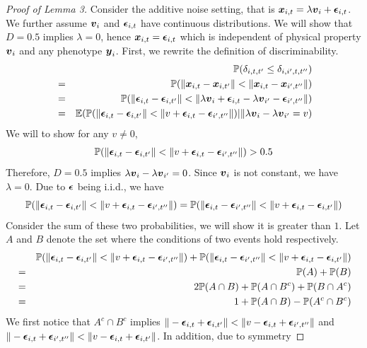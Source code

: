 \documentclass{article}
\begin{document}
\begin{proof}[Proof of Lemma 3]
	Consider the additive noise setting, that is $\boldsymbol{x}_{i,t}=\lambda \boldsymbol{v}_{i} + \boldsymbol{\epsilon}_{i,t}$. We further assume  $\boldsymbol{v}_{i}$ and $\boldsymbol{\epsilon}_{i,t}$ have continuous distributions. We will show that $D=0.5$ implies $\lambda = 0$, hence $\boldsymbol{x}_{i,t} = \boldsymbol{\epsilon}_{i,t}$ which is independent of physical property $\boldsymbol{v}_{i}$ and any phenotype $\boldsymbol{y}_{i}$. First, we rewrite the definition of discriminability.
	\begin{eqnarray*}
		& &\mathbb{P}(\delta_{i,t,t'} \leq \delta_{i,i',t,t''}) \\
		&=&\mathbb{P}(\|\boldsymbol{x}_{i,t}-\boldsymbol{x}_{i,t'}\|<\|\boldsymbol{x}_{i,t}-\boldsymbol{x}_{i',t''}\|) \\
		&=&\mathbb{P}(\|\boldsymbol{\epsilon}_{i,t}-\boldsymbol{\epsilon}_{i,t'}\| < \|\lambda \boldsymbol{v}_{i}+\boldsymbol{\epsilon}_{i,t}-\lambda \boldsymbol{v}_{i'} - \boldsymbol{\epsilon}_{i',t''}\|) \\
		&=& \mathbb{E} (\mathbb{P}(\|\boldsymbol{\epsilon}_{i,t}-\boldsymbol{\epsilon}_{i,t'}\| < \|v+\boldsymbol{\epsilon}_{i,t} - \boldsymbol{\epsilon}_{i',t''}\|)|\|\lambda \boldsymbol{v}_{i} - \lambda \boldsymbol{v}_{i'}=v)
	\end{eqnarray*}
	We will to show for any $v \neq 0$,   \[\mathbb{P}(\|\boldsymbol{\epsilon}_{i,t}-\boldsymbol{\epsilon}_{i,t'}\| < \|v+\boldsymbol{\epsilon}_{i,t} - \boldsymbol{\epsilon}_{i',t''}\|) > 0.5\]
	Therefore, $D=0.5$ implies $\lambda \boldsymbol{v}_{i} - \lambda \boldsymbol{v}_{i'}= 0$. Since $\boldsymbol{v}_{i}$ is not constant, we have $\lambda = 0$. Due to $\boldsymbol{\epsilon}$ being i.i.d., we have 
	\[\mathbb{P}(\|\boldsymbol{\epsilon}_{i,t}-\boldsymbol{\epsilon}_{i,t'}\| < \|v+\boldsymbol{\epsilon}_{i,t} - \boldsymbol{\epsilon}_{i',t''}\|) =  \mathbb{P}(\|\boldsymbol{\epsilon}_{i,t}-\boldsymbol{\epsilon}_{i',t''}\| < \|v+\boldsymbol{\epsilon}_{i,t} - \boldsymbol{\epsilon}_{i,t'}\|)\]
	Consider the sum of these two probabilities, we will show it is greater than $1$. Let $A$ and $B$ denote the set where the conditions of two events hold respectively.
	\begin{eqnarray*}
			& &\mathbb{P}(\|\boldsymbol{\epsilon}_{i,t}-\boldsymbol{\epsilon}_{i,t'}\| < \|v+\boldsymbol{\epsilon}_{i,t} - \boldsymbol{\epsilon}_{i',t''}\|) +  \mathbb{P}(\|\boldsymbol{\epsilon}_{i,t}-\boldsymbol{\epsilon}_{i',t''}\| < \|v+\boldsymbol{\epsilon}_{i,t} - \boldsymbol{\epsilon}_{i,t'}\|)\\
			&=&\mathbb{P}(A) + \mathbb{P}(B) \\
			&=& 2\mathbb{P}(A \cap B ) + \mathbb{P}(A \cap B^c ) + \mathbb{P}(B \cap A^c ) \\
			&=& 1+\mathbb{P}(A \cap B )- \mathbb{P}(A^c \cap B^c )
	\end{eqnarray*}
	We first notice that $A^c \cap B^c$ implies $\|-\boldsymbol{\epsilon}_{i,t}+\boldsymbol{\epsilon}_{i,t'}\| < \|v-\boldsymbol{\epsilon}_{i,t} + \boldsymbol{\epsilon}_{i',t''}\|$ and $\|-\boldsymbol{\epsilon}_{i,t}+\boldsymbol{\epsilon}_{i',t''}\| < \|v-\boldsymbol{\epsilon}_{i,t} + \boldsymbol{\epsilon}_{i,t'}\|$. In addition, due to symmetry

\end{proof}
\end{document}
